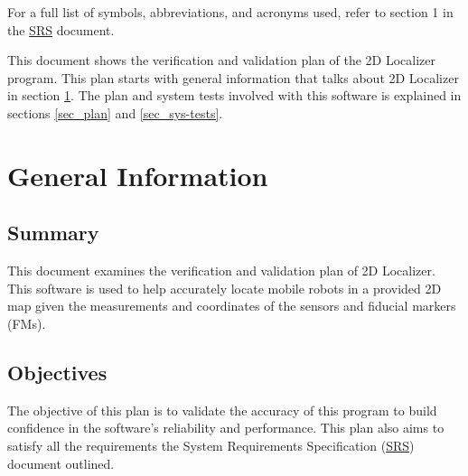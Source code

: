 \documentclass[12pt, titlepage]{article}
\begin{document}
For a full list of symbols, abbreviations, and acronyms used, refer to section 1 in the \href{https://github.com/AliyahJimoh/2D-Localizer/blob/main/docs/SRS/SRS.pdf}{SRS} document.

\newpage


This document shows the verification and validation plan of the 2D Localizer program. This plan starts with general information that talks about 2D Localizer in section \ref{sec_general}. The plan and system tests involved with this software is explained in sections \ref{sec_plan} and \ref{sec_sys-tests}.



\section{General Information}\label{sec_general}

\subsection{Summary}

This document examines the verification and validation plan of 2D Localizer. This software is used to help accurately locate mobile robots in a provided 2D map given the measurements and coordinates of the sensors and fiducial markers (FMs).

\subsection{Objectives}

The objective of this plan is to validate the accuracy of this program to build confidence in the software's reliability and performance. This plan also aims to satisfy all the requirements the System Requirements Specification (\href{https://github.com/AliyahJimoh/2D-Localizer/blob/main/docs/SRS/SRS.pdf}{SRS}) document outlined.  


\end{document}
